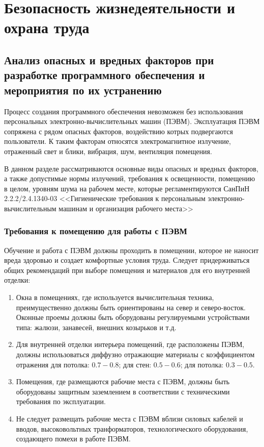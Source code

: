 \chapter{Безопасность жизнедеятельности и охрана труда}
\label{cha:ecolog}

\section{Анализ опасных и вредных факторов при разработке программного
	обеспечения и мероприятия по их устранению}
Процесс создания программного обеспечения невозможен без использования
персональных электронно-вычислительных машин (ПЭВМ). Эксплуатация ПЭВМ
сопряжена с рядом опасных факторов, воздействию котрых подвергаются
пользователи. К таким факторам относятся электромагнитное излучение,
отраженный свет и блики, вибрация, шум, вентиляция помещения.

В данном разделе рассматриваются основные виды опасных и вредных факторов, а
также допустимые нормы излучений, требования к освещенности, помещению в
целом, уровням шума на рабочем месте, которые регламентируются СанПиН
2.2.2/2.4.1340-03 <<Гигиенические требования к персональным
электронно-вычислительным машинам и организация рабочего места>>

\subsection{Требования к помещению для работы с ПЭВМ}
Обучение и работа с ПЭВМ должны проходить в помещении, которое не наносит
вреда здоровью и создает комфортные условия труда. Следует придерживаться
общих рекомендаций при выборе помещения и материалов для его внутренней
отделки:
\begin{enumerate}
\item Окна в помещениях, где используется вычислительная техника,
	преимущественно должны быть ориентированы на север и северо-восток.
	Оконные проемы должны быть оборудованы регулируемыми устройствами
	типа: жалюзи, занавесей, внешних козырьков и т.д.

\item Для внутренней отделки интерьера помещений, где расположены ПЭВМ, должны
	использоваться диффузно отражающие материалы с коэффициентом отражения
	для потолка: $0.7 - 0.8$; для стен: $0.5 - 0.6$; для потолка: $0.3 -
	0.5$.
\item Помещения, где размещаются рабочие места с ПЭВМ, должны быть оборудованы
	защитным заземлением в соответствии с техническими требования по
	эксплуатации.
\item Не следует размещать рабочие места с ПЭВМ вблизи силовых кабелей и
	вводов, высоковольтных транформаторов, технологического оборудования,
	создающего помехи в работе ПЭВМ.
\end{enumerate}


